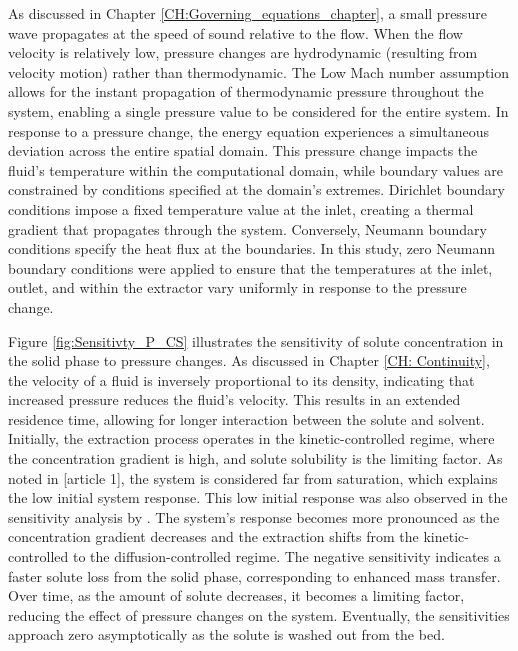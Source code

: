 \documentclass[../Article_Sensitivity_Analsysis.tex]{subfiles}
\begin{document}
	
	
	As discussed in Chapter \ref{CH:Governing_equations_chapter}, a small pressure wave propagates at the speed of sound relative to the flow. When the flow velocity is relatively low, pressure changes are hydrodynamic (resulting from velocity motion) rather than thermodynamic. The Low Mach number assumption allows for the instant propagation of thermodynamic pressure throughout the system, enabling a single pressure value to be considered for the entire system. In response to a pressure change, the energy equation experiences a simultaneous deviation across the entire spatial domain. This pressure change impacts the fluid's temperature within the computational domain, while boundary values are constrained by conditions specified at the domain's extremes. Dirichlet boundary conditions impose a fixed temperature value at the inlet, creating a thermal gradient that propagates through the system. Conversely, Neumann boundary conditions specify the heat flux at the boundaries. In this study, zero Neumann boundary conditions were applied to ensure that the temperatures at the inlet, outlet, and within the extractor vary uniformly in response to the pressure change.
	
	Figure \ref{fig:Sensitivty_P_CS} illustrates the sensitivity of solute concentration in the solid phase to pressure changes. As discussed in Chapter \ref{CH: Continuity}, the velocity of a fluid is inversely proportional to its density, indicating that increased pressure reduces the fluid's velocity. This results in an extended residence time, allowing for longer interaction between the solute and solvent.	Initially, the extraction process operates in the kinetic-controlled regime, where the concentration gradient is high, and solute solubility is the limiting factor. As noted in [article 1], the system is considered far from saturation, which explains the low initial system response. This low initial response was also observed in the sensitivity analysis by \citet{Fiori_2007}. The system's response becomes more pronounced as the concentration gradient decreases and the extraction shifts from the kinetic-controlled to the diffusion-controlled regime. The negative sensitivity indicates a faster solute loss from the solid phase, corresponding to enhanced mass transfer.  Over time, as the amount of solute decreases, it becomes a limiting factor, reducing the effect of pressure changes on the system. Eventually, the sensitivities approach zero asymptotically as the solute is washed out from the bed.
\end{document}
